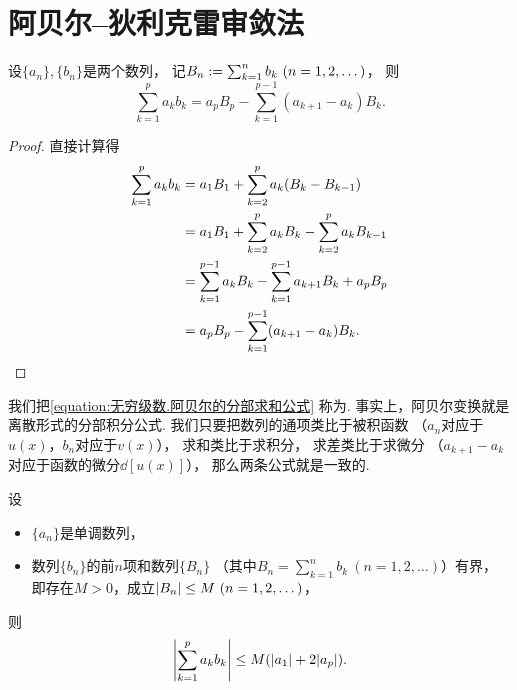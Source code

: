 \section{阿贝尔--狄利克雷审敛法}
\begin{lemma}[阿贝尔变换]
设\(\{a_n\},\{b_n\}\)是两个数列，
记\(B_n \defeq \sum_{k=1}^n b_k\ (n=1,2,\dotsc)\)，
则\begin{equation}\label{equation:无穷级数.阿贝尔的分部求和公式}
	\sum_{k=1}^p a_k b_k
	= a_p B_p - \sum_{k=1}^{p-1} (a_{k+1} - a_k) B_k.
\end{equation}
\begin{proof}
直接计算得\begin{align*}
	\sum_{k=1}^p a_k b_k
	&= a_1 B_1 + \sum_{k=2}^p a_k (B_k - B_{k-1}) \\
	&= a_1 B_1 + \sum_{k=2}^p a_k B_k - \sum_{k=2}^p a_k B_{k-1} \\
	&= \sum_{k=1}^{p-1} a_k B_k - \sum_{k=1}^{p-1} a_{k+1} B_k + a_p B_p \\
	&= a_p B_p - \sum_{k=1}^{p-1} (a_{k+1} - a_k) B_k.
	\qedhere
\end{align*}
\end{proof}
\end{lemma}
我们把\cref{equation:无穷级数.阿贝尔的分部求和公式} 称为.
事实上，阿贝尔变换就是离散形式的分部积分公式.
我们只要把数列的通项类比于被积函数
（\(a_n\)对应于\(u(x)\)，\(b_n\)对应于\(v(x)\)），
求和类比于求积分，
求差类比于求微分
（\(a_{k+1} - a_k\)对应于函数的微分\(\dd{[u(x)]}\)），
那么两条公式就是一致的.

\begin{lemma}\label{theorem:无穷级数.阿贝尔引理}
设\begin{itemize}
	\item \(\{a_n\}\)是单调数列，
	\item 数列\(\{b_n\}\)的前\(n\)项和数列\(\{B_n\}\)
	（其中\(B_n = \sum_{k=1}^n b_k\ (n=1,2,\dotsc)\)）有界，
	即存在\(M>0\)，成立\(\abs{B_n} \leq M\ (n=1,2,\dotsc)\)，
\end{itemize}
则\[
	\abs{\sum_{k=1}^p a_k b_k}
	\leq M(\abs{a_1} + 2 \abs{a_p}).
\]
\end{lemma}

